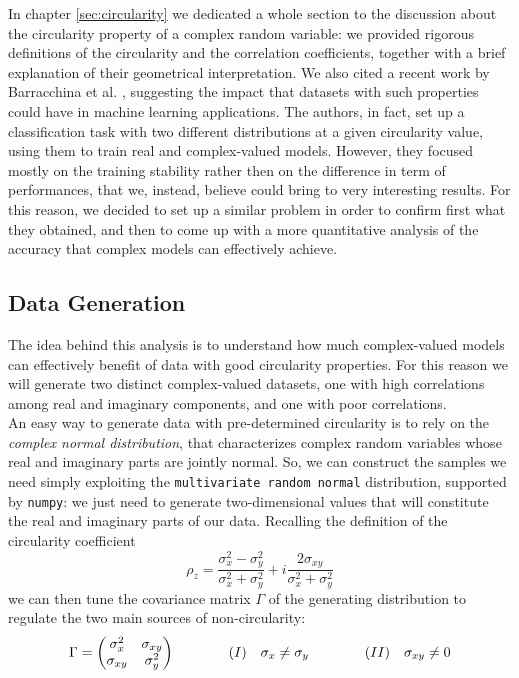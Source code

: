 \documentclass[../main.tex]{subfiles}
\begin{document}
In chapter \ref{sec:circularity} we dedicated a whole section to the discussion about the circularity property of a complex random variable: we provided rigorous definitions of the circularity and the correlation coefficients, together with a brief explanation of their geometrical interpretation. We also cited a recent work by Barracchina et al. \cite{barrachina2021complexvalued}, suggesting the impact that datasets with such properties could have in machine learning applications. The authors, in fact, set up a classification task with two different distributions at a given circularity value, using them to train real and complex-valued models. However, they focused mostly on the training stability rather then on the difference in term of performances, that we, instead, believe could bring to very interesting results. For this reason, we decided to set up a similar problem in order to confirm first what they obtained, and then to come up with a more quantitative analysis of the accuracy that complex models can effectively achieve.

\subsection*{Data Generation}

The idea behind this analysis is to understand how much complex-valued models can effectively benefit of data with good circularity properties. For this reason we will generate two distinct complex-valued datasets, one with high correlations among real and imaginary components, and one with poor correlations.\\
An easy way to generate data with pre-determined circularity is to rely on the \textit{complex normal distribution}, that characterizes complex random variables whose real and imaginary parts are jointly normal. So, we can construct the samples we need simply exploiting the \texttt{multivariate random normal} distribution, supported by \texttt{numpy}: we just need to generate two-dimensional values that will constitute the real and imaginary parts of our data. Recalling the definition of the circularity coefficient
\[ \rho_z = \frac{\sigma_x^2 - \sigma_y^2}{\sigma_x^2 + \sigma_y^2} + i\frac{2\sigma_{xy}}{\sigma_x^2 + \sigma_y^2} \]
we can then tune the covariance matrix $\Gamma$ of the generating distribution to regulate the two main sources of non-circularity:
\[ \Gamma=\mqty(\sigma_x^2 & \sigma_{xy} \\ \sigma_{xy} & \sigma_y^2) \qquad\qquad  (I)\quad\sigma_x\neq\sigma_y \qquad\qquad (II)\quad\sigma_{xy}\neq 0 \]
\end{document}
